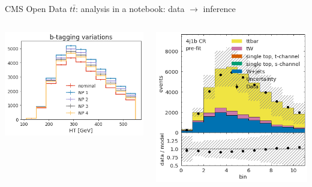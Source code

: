 \documentclass[aspectratio=169]{beamer}
\begin{document}
\begin{frame}{CMS Open Data $t\bar{t}$: analysis in a notebook: data $\to$ inference}
\begin{columns}
\begin{columns}
\includegraphics[width=\linewidth]{PLOTS/gac-ttbar-plot-2.png}

\vfill
\includegraphics[width=\linewidth]{PLOTS/gac-ttbar-plot-5.png}


\end{columns}
\end{columns}
\end{frame}
\end{document}
